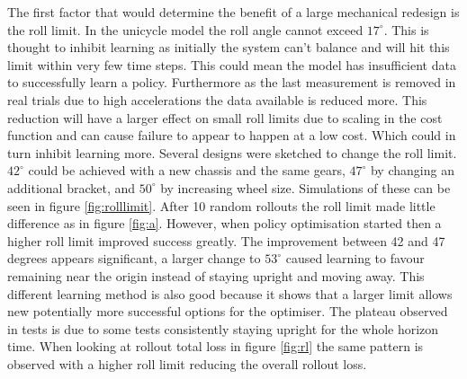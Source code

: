 \documentclass[twoside,twocolumn,12pt]{article}
\begin{document}
The first factor that would determine the benefit of a large mechanical redesign is the roll limit. In the unicycle model the roll angle cannot exceed $17^{\circ}$. This is thought to inhibit learning as initially the system can't balance and will hit this limit within very few time steps. This could mean the model has insufficient data to successfully learn a policy. Furthermore as the last measurement is removed in real trials due to high accelerations the data available is reduced more. This reduction will have a larger effect on small roll limits due to scaling in the cost function and can cause failure to appear to happen at a low cost. Which could in turn inhibit learning more.
\newline
Several designs were sketched to change the roll limit. $42^{\circ}$ could be achieved with a new chassis and the same gears, $47^{\circ}$ by changing an additional bracket, and $50^{\circ}$ by increasing wheel size. Simulations of these can be seen in figure \ref{fig:rolllimit}.
\newline
After 10 random rollouts the roll limit made little difference as in figure \ref{fig:a}. However, when policy optimisation started then a higher roll limit improved success greatly. The improvement between 42 and 47 degrees appears significant, a larger change to $53^{\circ}$ caused learning to favour remaining near the origin instead of staying upright and moving away. This different learning method is also good because it shows that a larger limit allows new potentially more successful options for the optimiser. The plateau observed in tests is due to some tests consistently staying upright for the whole horizon time. When looking at rollout total loss in figure \ref{fig:rl} the same pattern is observed with a higher roll limit reducing the overall rollout loss.
\end{document}
